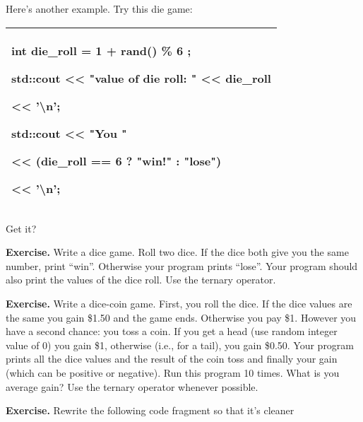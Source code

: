 \documentclass[
]{article}
\begin{document}
Here's another example. Try this die game:

\begin{longtable}[]{@{}l@{}}
\toprule
\endhead
\begin{minipage}[t]{0.97\columnwidth}\raggedright
int die\_roll = 1 + rand() \% 6 ;

std::cout \textless\textless{} "value of die roll: "
\textless\textless{} die\_roll

\textless\textless{} '\textbackslash n';

std::cout \textless\textless{} "You "

\textless\textless{} (die\_roll == 6 ? "win!" : "lose")

\textless\textless{} '\textbackslash n';\strut
\end{minipage}\tabularnewline
\bottomrule
\end{longtable}

Get it?

\textbf{Exercise.} Write a dice game. Roll two dice. If the dice both
give you the same number, print ``win''. Otherwise your program prints
``lose''. Your program should also print the values of the dice roll.
Use the ternary operator.

\textbf{Exercise.} Write a dice-coin game. First, you roll the dice. If
the dice values are the same you gain \$1.50 and the game ends.
Otherwise you pay \$1. However you have a second chance: you toss a
coin. If you get a head (use random integer value of 0) you gain \$1,
otherwise (i.e., for a tail), you gain \$0.50. Your program prints all
the dice values and the result of the coin toss and finally your gain
(which can be positive or negative). Run this program 10 times. What is
you average gain? Use the ternary operator whenever possible.

\textbf{Exercise.} Rewrite the following code fragment so that it's
cleaner
\end{document}
